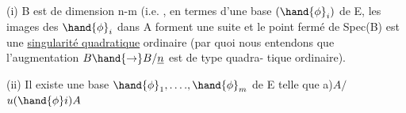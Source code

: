  (i) B est de dimension n-m (i.e. , en termes d'une base  $(\hand{\phi}_i)$ de
\placedmargin{$\|$} E, les images des $\hand{\phi}_i$ dans A forment une suite  et  le
 point fermé de Spec(B) est une \uline{singularité quadratique}
ordinaire (par quoi nous entendons que l'augmentation $B\hand{\to} B/\underline{n}$ est de type quadra-%
tique ordinaire).

(ii) Il existe une base $\hand{\phi}_1 ,\ldots., \hand{\phi}_m$ de E telle que a)$A/$$u(\hand{\phi} i)A$

